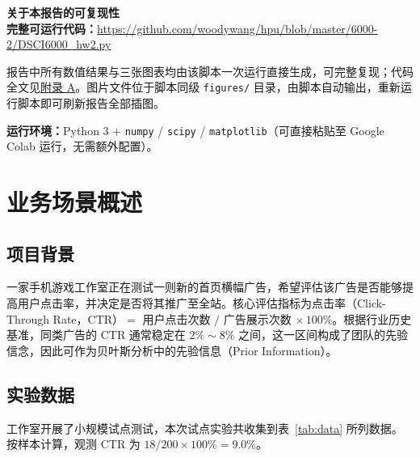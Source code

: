 \documentclass[12pt,a4paper,UTF8,fontset=none]{ctexart}
\begin{document}


\begingroup
  \renewcommand{\contentsname}{\sffamily\color{navy}目\quad 录}
  \setcounter{tocdepth}{2}
  \tableofcontents
\endgroup
\clearpage
{}
\setcounter{page}{1}

\begin{infobox}
\textbf{\color{navy}关于本报告的可复现性}\\[4pt]
\textbf{完整可运行代码：}\url{https://github.com/woodywang/hpu/blob/master/6000-2/DSCI6000_hw2.py}

报告中所有数值结果与三张图表均由该脚本一次运行直接生成，可完整复现；代码全文见\hyperref[app:code]{附录 A}。图片文件位于脚本同级 \texttt{figures/} 目录，由脚本自动输出，重新运行脚本即可刷新报告全部插图。

\textbf{运行环境：}Python 3 $+$ \texttt{numpy} / \texttt{scipy} / \texttt{matplotlib}（可直接粘贴至 Google Colab 运行，无需额外配置）。
\end{infobox}

\section{业务场景概述}

\subsection{项目背景}

一家手机游戏工作室正在测试一则新的首页横幅广告，希望评估该广告是否能够提高用户点击率，并决定是否将其推广至全站。核心评估指标为点击率（Click-Through Rate，CTR）$=$ 用户点击次数 $/$ 广告展示次数 $\times\,100\%$。根据行业历史基准，同类广告的 CTR 通常稳定在 $2\%\sim8\%$ 之间，这一区间构成了团队的先验信念，因此可作为贝叶斯分析中的先验信息（Prior Information）。

\subsection{实验数据}

工作室开展了小规模试点测试，本次试点实验共收集到表~\ref{tab:data} 所列数据。按样本计算，观测 CTR 为 $18/200\times100\% = 9.0\%$。
\end{document}
